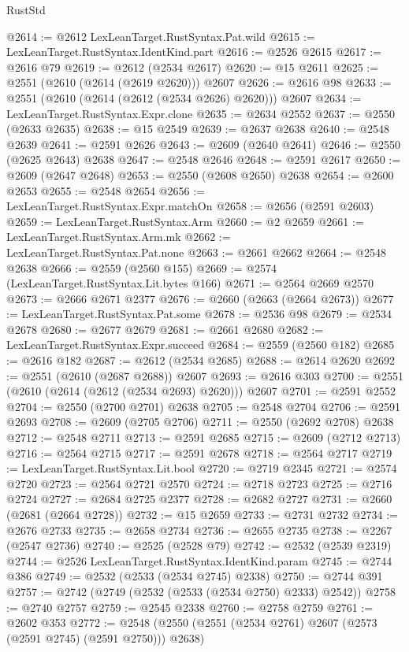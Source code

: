 \begin{lexlean}{RustStd}
\begin{coremodule}
@2614 := @2612 LexLeanTarget.RustSyntax.Pat.wild
@2615 := LexLeanTarget.RustSyntax.IdentKind.part
@2616 := @2526 @2615
@2617 := @2616 @79
@2619 := @2612 (@2534 @2617)
@2620 := @15 @2611
@2625 := @2551 (@2610 (@2614 (@2619 @2620))) @2607
@2626 := @2616 @98
@2633 := @2551 (@2610 (@2614 (@2612 (@2534 @2626) @2620))) @2607
@2634 := LexLeanTarget.RustSyntax.Expr.clone
@2635 := @2634 @2552
@2637 := @2550 (@2633 @2635)
@2638 := @15 @2549
@2639 := @2637 @2638
@2640 := @2548 @2639
@2641 := @2591 @2626
@2643 := @2609 (@2640 @2641)
@2646 := @2550 (@2625 @2643) @2638
@2647 := @2548 @2646
@2648 := @2591 @2617
@2650 := @2609 (@2647 @2648)
@2653 := @2550 (@2608 @2650) @2638
@2654 := @2600 @2653
@2655 := @2548 @2654
@2656 := LexLeanTarget.RustSyntax.Expr.matchOn
@2658 := @2656 (@2591 @2603)
@2659 := LexLeanTarget.RustSyntax.Arm
@2660 := @2 @2659
@2661 := LexLeanTarget.RustSyntax.Arm.mk
@2662 := LexLeanTarget.RustSyntax.Pat.none
@2663 := @2661 @2662
@2664 := @2548 @2638
@2666 := @2559 (@2560 @155)
@2669 := @2574 (LexLeanTarget.RustSyntax.Lit.bytes @166)
@2671 := @2564 @2669 @2570
@2673 := @2666 @2671 @2377
@2676 := @2660 (@2663 (@2664 @2673))
@2677 := LexLeanTarget.RustSyntax.Pat.some
@2678 := @2536 @98
@2679 := @2534 @2678
@2680 := @2677 @2679
@2681 := @2661 @2680
@2682 := LexLeanTarget.RustSyntax.Expr.succeed
@2684 := @2559 (@2560 @182)
@2685 := @2616 @182
@2687 := @2612 (@2534 @2685)
@2688 := @2614 @2620
@2692 := @2551 (@2610 (@2687 @2688)) @2607
@2693 := @2616 @303
@2700 := @2551 (@2610 (@2614 (@2612 (@2534 @2693) @2620))) @2607
@2701 := @2591 @2552
@2704 := @2550 (@2700 @2701) @2638
@2705 := @2548 @2704
@2706 := @2591 @2693
@2708 := @2609 (@2705 @2706)
@2711 := @2550 (@2692 @2708) @2638
@2712 := @2548 @2711
@2713 := @2591 @2685
@2715 := @2609 (@2712 @2713)
@2716 := @2564 @2715
@2717 := @2591 @2678
@2718 := @2564 @2717
@2719 := LexLeanTarget.RustSyntax.Lit.bool
@2720 := @2719 @2345
@2721 := @2574 @2720
@2723 := @2564 @2721 @2570
@2724 := @2718 @2723
@2725 := @2716 @2724
@2727 := @2684 @2725 @2377
@2728 := @2682 @2727
@2731 := @2660 (@2681 (@2664 @2728))
@2732 := @15 @2659
@2733 := @2731 @2732
@2734 := @2676 @2733
@2735 := @2658 @2734
@2736 := @2655 @2735
@2738 := @2267 (@2547 @2736)
@2740 := @2525 (@2528 @79)
@2742 := @2532 (@2539 @2319)
@2744 := @2526 LexLeanTarget.RustSyntax.IdentKind.param
@2745 := @2744 @386
@2749 := @2532 (@2533 (@2534 @2745) @2338)
@2750 := @2744 @391
@2757 := @2742 (@2749 (@2532 (@2533 (@2534 @2750) @2333) @2542))
@2758 := @2740 @2757
@2759 := @2545 @2338
@2760 := @2758 @2759
@2761 := @2602 @353
@2772 := @2548 (@2550 (@2551 (@2534 @2761) @2607 (@2573 (@2591 @2745) (@2591 @2750))) @2638)

\end{coremodule}
\end{lexlean}
